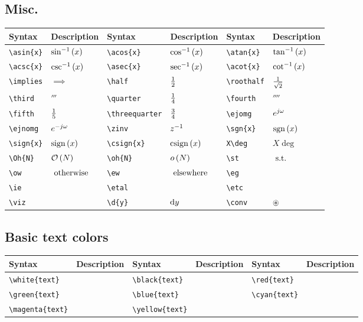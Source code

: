 \documentclass{article}
\begin{document}
	\subsection{Misc.}
	\begin{table}[H]
		\begin{tabular}{|l|l|l|l|l|l|}
			\hline
			Syntax	&	Description	&	Syntax	&	Description	&	Syntax	&	Description	 \\
			\hline
			\verb|\asin{x}|	&	$\sin^{-1}\left(x\right)$	&	\verb|\acos{x}|	&	$\cos^{-1}\left(x\right)$	&	\verb|\atan{x}|	&	$\tan^{-1}\left(x\right)$ \\	
			\verb|\acsc{x}|	&	$\csc^{-1}\left(x\right)$	&	\verb|\asec{x}|	&	$\sec^{-1}\left(x\right)$	&	\verb|\acot{x}|	&	$\cot^{-1}\left(x\right)$ \\
			\verb|\implies|	&	$\implies$	&	\verb|\half|	&	$\frac{1}{2}$	&	\verb|\roothalf|	&	$\frac{1}{\sqrt{2}}$ \\
			\verb|\third|	&	$\third$	&	\verb|\quarter|	&	$\frac{1}{4}$	&	\verb|\fourth|	&	$\fourth$ \\
			\verb|\fifth|	&	$\frac{1}{5}$	&	\verb|\threequarter|	&	$\frac{3}{4}$	&	\verb|\ejomg|	&	$e^{j\omega}$ \\
			\verb|\ejnomg|	&	$e^{-j\omega}$	&	\verb|\zinv|	&	$z^{-1}$	&	\verb|\sgn{x}|	&	$\mathrm{sgn}\left(x\right)$ \\
			\verb|\sign{x}|	&	$\mathrm{sign}\left(x\right)$	&	\verb|\csign{x}|	&	$\mathrm{csign}\left(x\right)$ & \verb|X\deg|	&	$X\deg$	\\			
			\verb|\Oh{N}|	&	$\mathcal{O}\left(N\right)$	&	\verb|\oh{N}|	&	$o\left(N\right)$	&	\verb|\st|	&	$~\mathrm{s.t.}~$ \\
			\verb|\ow|	&	$~\mathrm{otherwise}~$	&	\verb|\ew|	&	$~\mathrm{elsewhere}~$	&	\verb|\eg|	&	\eg \\
			\verb|\ie|	&	\ie	&	\verb|\etal|	&	\etal	&	\verb|\etc|	&	\etc \\
			\verb|\viz|	&	\viz & \verb|\d{y}|	&	$\mathrm{d}y$	&	\verb|\conv|	&	$\circledast$	\\
			\hline	
		\end{tabular}
	\end{table}

	\subsection{Basic text colors}
	\begin{table}[H]
		\begin{tabular}{|l|l|l|l|l|l|}
			\hline
			Syntax	&	Description	&	Syntax	&	Description	&	Syntax	&	Description	 \\
			\hline
			\verb|\white{text}|	&	\white{text}	&	\verb|\black{text}|	&	\black{text}	&	\verb|\red{text}|	&	\red{text} \\	
			\verb|\green{text}|	&	\green{text}	&	\verb|\blue{text}|	&	\blue{text}	&	\verb|\cyan{text}|	&	\cyan{text} \\
			\verb|\magenta{text}|	&	\magenta{text}	&	\verb|\yellow{text}|	&	\yellow{text}	&		&	 \\
			\hline	
		\end{tabular}
	\end{table}
\end{document}

